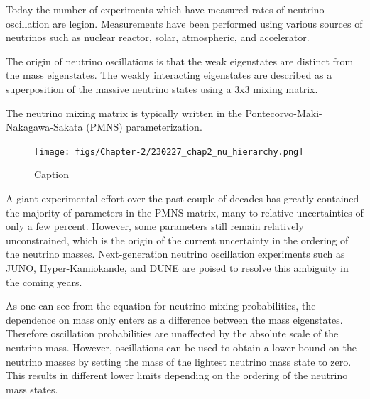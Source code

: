 Today the number of experiments which have measured rates of neutrino oscillation are legion. Measurements have been performed using various sources of neutrinos such as nuclear reactor, solar, atmospheric, and accelerator. 

The origin of neutrino oscillations is that the weak eigenstates are distinct from the mass eigenstates. The weakly interacting eigenstates are described as a superposition of the massive neutrino states using a 3x3 mixing matrix. 

The neutrino mixing matrix is typically written in the Pontecorvo-Maki-Nakagawa-Sakata (PMNS) parameterization.

\begin{figure}[htbp]
    \centering
    \texttt{[image: figs/Chapter-2/230227\_chap2\_nu\_hierarchy.png]}
    \caption{Caption}
    \label{fig:chap2-nu-hierarchy}
\end{figure}

A giant experimental effort over the past couple of decades has greatly contained the majority of parameters in the PMNS matrix, many to relative uncertainties of only a few percent. However, some parameters still remain relatively unconstrained, which is the origin of the current uncertainty in the ordering of the neutrino masses. Next-generation neutrino oscillation experiments such as JUNO, Hyper-Kamiokande, and DUNE are poised to resolve this ambiguity in the coming years.

As one can see from the equation for neutrino mixing probabilities, the dependence on mass only enters as a difference between the mass eigenstates. Therefore oscillation probabilities are unaffected by the absolute scale of the neutrino mass. However, oscillations can be used to obtain a lower bound on the neutrino masses by setting the mass of the lightest neutrino mass state to zero. This results in different lower limits depending on the ordering of the neutrino mass states.

